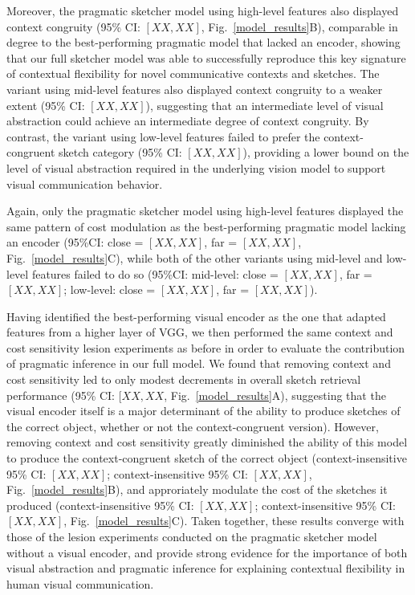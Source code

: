 \documentclass[9pt,twocolumn,twoside]{pnas-new}
\begin{document}
Moreover, the pragmatic sketcher model using high-level features also displayed context congruity (95\% CI: $[XX,XX]$, Fig.~\ref{model_results}B), comparable in degree to the best-performing pragmatic model that lacked an encoder, showing that our full sketcher model was able to successfully reproduce this key signature of contextual flexibility for novel communicative contexts and sketches. 
The variant using mid-level features also displayed context congruity to a weaker extent (95\% CI: $[XX,XX]$), suggesting that an intermediate level of visual abstraction could achieve an intermediate degree of context congruity. 
By contrast, the variant using low-level features failed to prefer the context-congruent sketch category (95\% CI: $[XX,XX]$), providing a lower bound on the level of visual abstraction required in the underlying vision model to support visual communication behavior. 

Again, only the pragmatic sketcher model using high-level features displayed the same pattern of cost modulation as the best-performing pragmatic model lacking an encoder (95\%CI: close = $[XX,XX]$, far = $[XX,XX]$, Fig.~\ref{model_results}C), while both of the other variants using mid-level and low-level features failed to do so (95\%CI: mid-level: close = $[XX,XX]$, far = $[XX,XX]$; low-level: close = $[XX,XX]$, far = $[XX,XX]$).  

Having identified the best-performing visual encoder as the one that adapted features from a higher layer of VGG, we then performed the same context and cost sensitivity lesion experiments as before in order to evaluate the contribution of pragmatic inference in our full model. 
We found that removing context and cost sensitivity led to only modest decrements in overall sketch retrieval performance (95\% CI: $[XX, XX$, Fig.~\ref{model_results}A), suggesting that the visual encoder itself is a major determinant of the ability to produce sketches of the correct object, whether or not the context-congruent version). 
However, removing context and cost sensitivity greatly diminished the ability of this model to produce the context-congruent sketch of the correct object (context-insensitive 95\% CI: $[XX,XX]$; context-insensitive 95\% CI: $[XX,XX]$, Fig.~\ref{model_results}B), and approriately modulate the cost of the sketches it produced (context-insensitive 95\% CI: $[XX,XX]$; context-insensitive 95\% CI: $[XX,XX]$, Fig.~\ref{model_results}C). 
Taken together, these results converge with those of the lesion experiments conducted on the pragmatic sketcher model without a visual encoder, and provide strong evidence for the importance of both visual abstraction and pragmatic inference for explaining contextual flexibility in human visual communication. 
\end{document}
